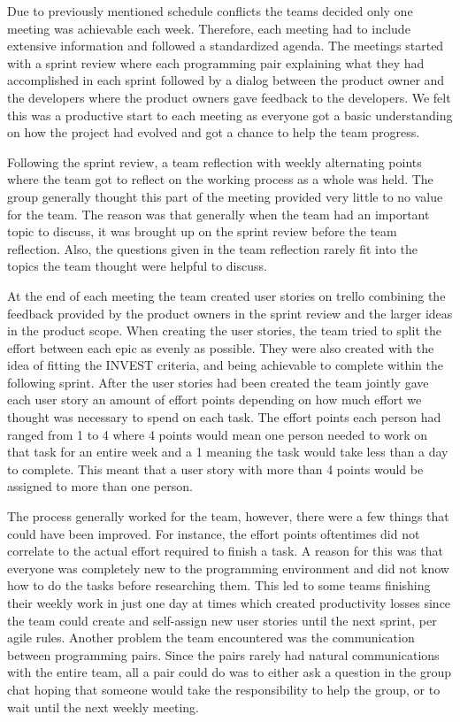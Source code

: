 Due to previously mentioned schedule conflicts the teams decided only one meeting was achievable each week. Therefore, each meeting had to include extensive information and followed a standardized agenda. The meetings started with a sprint review where each programming pair explaining what they had accomplished in each sprint followed by a dialog between the product owner and the developers where the product owners gave feedback to the developers. We felt this was a productive start to each meeting as everyone got a basic understanding on how the project had evolved and got a chance to help the team progress. 

Following the sprint review, a team reflection with weekly alternating points where the team got to reflect on the working process as a whole was held. The group generally thought this part of the meeting provided very little to no value for the team. The reason was that generally when the team had an important topic to discuss, it was brought up on the sprint review before the team reflection. Also, the questions given in the team reflection rarely fit into the topics the team thought were helpful to discuss. 

At the end of each meeting the team created user stories on trello combining the feedback provided by the product owners in the sprint review and the larger ideas in the product scope. When creating the user stories, the team tried to split the effort between each epic as evenly as possible. They were also created with the idea of fitting the INVEST criteria, and being achievable to complete within the following sprint. After the user stories had been created the team jointly gave each user story an amount of effort points depending on how much effort we thought was necessary to spend on each task. The effort points each person had ranged from 1 to 4 where 4 points would mean one person needed to work on that task for an entire week and a 1 meaning the task would take less than a day to complete. This meant that a user story with more than 4 points would be assigned to more than one person.

The process generally worked for the team, however, there were a few things that could have been improved. For instance, the effort points oftentimes did not correlate to the actual effort required to finish a task. A reason for this was that everyone was completely new to the programming environment and did not know how to do the tasks before researching them. This led to some teams finishing their weekly work in just one day at times which created productivity losses since the team could create and self-assign new user stories until the next sprint, per agile rules. Another problem the team encountered was the communication between programming pairs. Since the pairs rarely had natural communications with the entire team, all a pair could do was to either ask a question in the group chat hoping that someone would take the responsibility to help the group, or to wait until the next weekly meeting.




